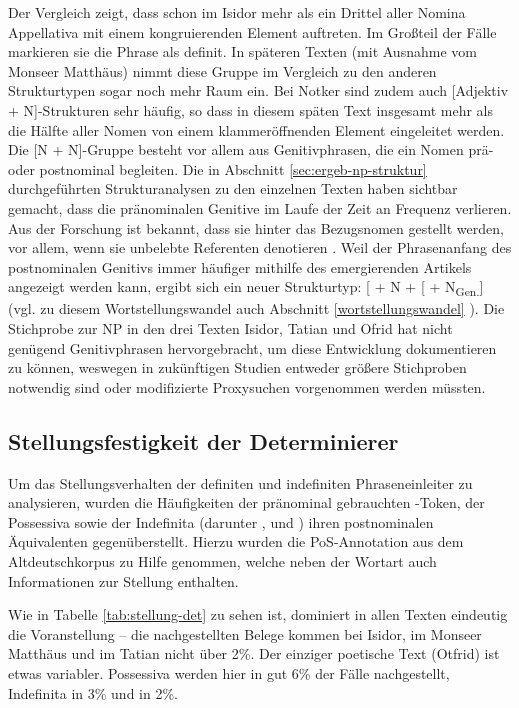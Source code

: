 Der Vergleich zeigt, dass schon im Isidor mehr als ein Drittel aller Nomina Appellativa mit einem kongruierenden Element auftreten. Im Großteil der Fälle markieren sie die Phrase als definit. In späteren Texten (mit Ausnahme vom Monseer Matthäus) nimmt diese Gruppe im Vergleich zu den anderen Strukturtypen sogar noch mehr Raum ein. Bei Notker sind zudem auch [Adjektiv + N]-Strukturen sehr häufig, so dass in diesem späten Text insgesamt mehr als die Hälfte aller Nomen von einem  klammeröffnenden Element eingeleitet werden. Die [N + N]-Gruppe besteht vor allem aus Genitivphrasen, die ein Nomen prä- oder postnominal begleiten. Die in Abschnitt \ref{sec:ergeb-np-struktur} durchgeführten Strukturanalysen zu den einzelnen Texten haben sichtbar gemacht, dass die pränominalen Genitive im Laufe der Zeit an Frequenz verlieren. Aus der Forschung ist bekannt, dass sie hinter das Bezugsnomen gestellt werden, vor allem, wenn sie unbelebte Referenten denotieren \parencite{Demske2001}. Weil der Phrasenanfang des postnominalen Genitivs immer häufiger mithilfe des emergierenden Artikels angezeigt werden kann, ergibt sich ein neuer Strukturtyp: [ + N + [ + N\textsubscript{Gen.}] (vgl. zu diesem Wortstellungswandel auch Abschnitt \ref{wortstellungswandel} ). Die Stichprobe zur NP in den drei Texten Isidor, Tatian und Ofrid hat nicht genügend Genitivphrasen hervorgebracht, um diese Entwicklung dokumentieren zu können, weswegen in zukünftigen Studien entweder größere Stichproben notwendig sind oder modifizierte Proxysuchen vorgenommen werden müssten.   


\subsection{Stellungsfestigkeit der Determinierer} \label{sec:ergebnisse-stellung}

Um das Stellungsverhalten der definiten und indefiniten Phraseneinleiter zu analysieren, wurden die Häufigkeiten der pränominal gebrauchten -Token, der Possessiva sowie der Indefinita (darunter ,  und ) ihren postnominalen Äquivalenten gegenüberstellt. Hierzu wurden die PoS-Annotation aus dem Altdeutschkorpus zu Hilfe genommen, welche neben der Wortart auch Informationen zur Stellung enthalten. 

Wie in Tabelle \ref{tab:stellung-det} zu sehen ist, dominiert in allen Texten eindeutig die Voranstellung -- die nachgestellten Belege kommen bei Isidor, im Monseer Matthäus und im Tatian nicht über 2\%. Der einziger poetische Text (Otfrid) ist etwas variabler. Possessiva werden hier in gut 6\% der Fälle nachgestellt, Indefinita in 3\% und  in 2\%. 

